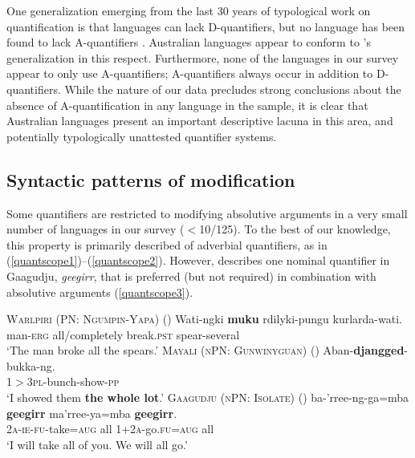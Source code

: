 \documentclass[12pt,egregdoesnotlikesansseriftitles]{scrartcl}
\makeatletter
\newcommand{\ofy}{/125} %
\makeatother
\begin{document}
One generalization emerging from the last 30 years of typological work on quantification is that languages can lack D-quantifiers, but no language has been found to lack A-quantifiers \citep{introqnl}. Australian languages appear to conform to \cite{bachetal95}'s generalization in this respect. Furthermore, none of the languages in our survey appear to only use A-quantifiers; A-quantifiers always  occur in addition to D-quantifiers.  While the nature of our data precludes strong conclusions about the absence of A-quantification in any language in the sample, it is clear that Australian languages present an important descriptive lacuna in this area, and potentially typologically unattested quantifier systems.

\subsection{Syntactic patterns of modification}

Some quantifiers are restricted to modifying absolutive arguments in a very small number of languages in our survey ($<$10\ofy). To the best of our knowledge, this property is primarily described of adverbial quantifiers, as in (\ref{quantscope1})--(\ref{quantscope2}). However, \cite{harvey92} describes one nominal quantifier in Gaagudju, \textit{geegirr}, that is preferred (but not required) in combination with absolutive arguments (\ref{quantscope3}).

\begin{exe}
  \ex  \textsc{Warlpiri (PN: Ngumpin-Yapa)} (\citealt[15]{bowler17})
  \gll Wati-ngki \textbf{muku} rdilyki-pungu kurlarda-wati.\\
  man-\textsc{erg} all/completely break.\textsc{pst} spear-several\\
  \glt `The man broke all the spears.' \label{quantscope1}
  \ex \textsc{Mayali (nPN: Gunwinyguan)} (\citealt[233]{evans95})
  \gll Aban-\textbf{djangged}-bukka-ng.\\
  1$>$3\textsc{pl}-bunch-show-\textsc{pp}\\
  \glt `I showed them \textbf{the whole lot}.' \label{quantscope2}
    \ex  \textsc{Gaagudju (nPN: Isolate)} (\citealt[307]{harvey92})
  \gll ba-'rree-ng-ga=mba \textbf{geegirr} ma'rree-ya=mba \textbf{geegirr}.\\ 
  2\textsc{a-ie-fu}-take=\textsc{aug} all 1+2\textsc{a}-go.\textsc{fu=aug} all\\
  \glt `I will take all of you. We will all go.' \label{quantscope3}
\end{exe}
\end{document}
